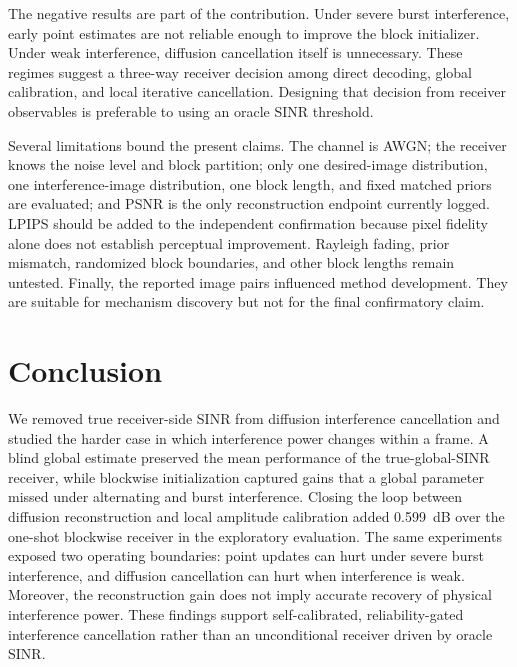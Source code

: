 \documentclass[conference]{IEEEtran}
\begin{document}
The negative results are part of the contribution. Under severe burst
interference, early point estimates are not reliable enough to improve the
block initializer. Under weak interference, diffusion cancellation itself is
unnecessary. These regimes suggest a three-way receiver decision among direct
decoding, global calibration, and local iterative cancellation. Designing
that decision from receiver observables is preferable to using an oracle SINR
threshold.

Several limitations bound the present claims. The channel is AWGN; the
receiver knows the noise level and block partition; only one desired-image
distribution, one interference-image distribution, one block length, and
fixed matched priors are evaluated; and PSNR is the only reconstruction
endpoint currently logged. LPIPS should be added to the independent
confirmation because pixel fidelity alone does not establish perceptual
improvement. Rayleigh fading, prior mismatch, randomized block boundaries,
and other block lengths remain untested. Finally, the reported image pairs
influenced method development. They are suitable for mechanism discovery but
not for the final confirmatory claim.

\section{Conclusion}

We removed true receiver-side SINR from diffusion interference cancellation
and studied the harder case in which interference power changes within a
frame. A blind global estimate preserved the mean performance of the
true-global-SINR receiver, while blockwise initialization captured gains that
a global parameter missed under alternating and burst interference. Closing
the loop between diffusion reconstruction and local amplitude calibration
added 0.599~dB over the one-shot blockwise receiver in the exploratory
evaluation. The same experiments exposed two operating boundaries: point
updates can hurt under severe burst interference, and diffusion cancellation
can hurt when interference is weak. Moreover, the reconstruction gain does
not imply accurate recovery of physical interference power. These findings
support self-calibrated, reliability-gated interference cancellation rather
than an unconditional receiver driven by oracle SINR.

\begingroup
\sloppy


\endgroup
\end{document}
